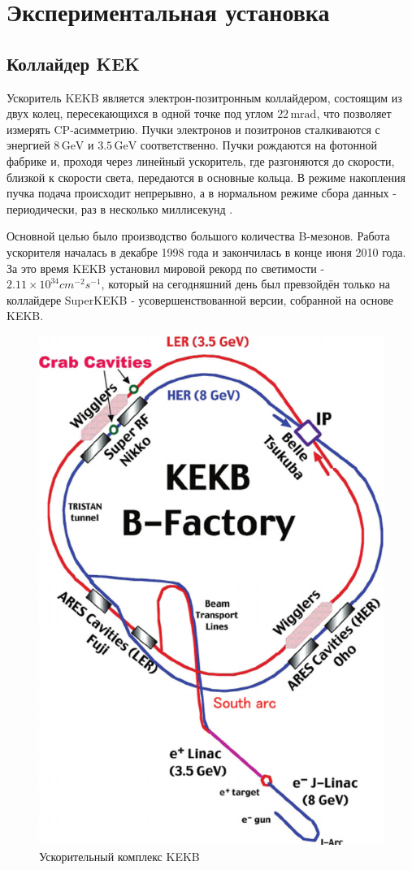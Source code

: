 \section{Экспериментальная установка}

\subsection{Коллайдер KEK}
Ускоритель KEKB является электрон-позитронным коллайдером, состоящим из двух 
колец, пересекающихся в одной точке под углом $22\,\text{mrad}$, что позволяет измерять CP-асимметрию. 
Пучки электронов и позитронов сталкиваются с энергией $8\,\text{GeV}$ и $3.5\,\text{GeV}$ соответственно.
Пучки рождаются на фотонной фабрике и, проходя через линейный ускоритель, где разгоняются до скорости, близкой к скорости света, 
передаются в основные кольца. В режиме накопления пучка подача происходит непрерывно, а в нормальном режиме 
сбора данных - периодически, раз в несколько миллисекунд .

Основной целью было производство большого количества B-мезонов. Работа ускорителя началась в декабре
1998 года и закончилась в конце июня 2010 года. За это время KEKB установил мировой
рекорд по светимости - $2.11\times 10^{34} cm^{-2}s^{-1}$, который на сегодняшний день был
превзойдён только на коллайдере SuperKEKB - усовершенствованной версии, собранной
на основе KEKB.


\begin{figure}[H]
    \centering
    \includegraphics[width=0.5\linewidth]{img/kekb.png}
    \caption{Ускорительный комплекс KEKB}
    \label{the:kek}
\end{figure}

